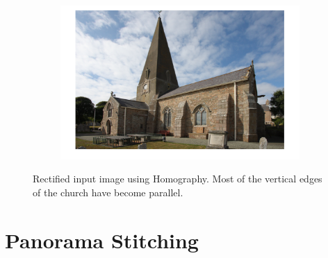 \documentclass{paper}
\begin{document}
\begin{figure}[H]
    \centering
    \begin{subfigure}{1.0\textwidth}
        \includegraphics[width=\textwidth]{rectify/rectified_skewed_church}
    \end{subfigure}
    
    \caption{Rectified input image using Homography. Most of the vertical edges of the church have become parallel. }
    \label{fig:rectified_skewed_church}       
\end{figure}








\section{Panorama Stitching}
\end{document}
